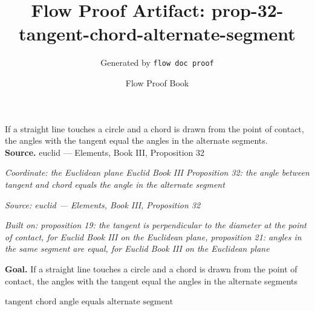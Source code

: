 \documentclass[11pt]{article}
\title{Flow Proof Artifact: prop-32-tangent-chord-alternate-segment}
\author{Generated by \texttt{flow doc proof}}
\date{Flow Proof Book}
\theoremstyle{definition}
\begin{document}
\maketitle
If a straight line touches a circle and a chord is drawn from the point of contact, the angles with the tangent equal the angles in the alternate segments.\\[0.5em]
\textbf{Source.} euclid — Elements, Book III, Proposition 32\\[0.5em]
\bigskip
{}\par
\smallskip\noindent\textit{Coordinate: the Euclidean plane \cdot Euclid Book III \cdot Proposition 32: the angle between tangent and chord equals the angle in the alternate segment}\par
\smallskip\noindent\textit{Source: euclid — Elements, Book III, Proposition 32}\par
\smallskip\noindent\textit{Built on: proposition 19: the tangent is perpendicular to the diameter at the point of contact, for Euclid Book III on the Euclidean plane, proposition 21: angles in the same segment are equal, for Euclid Book III on the Euclidean plane}\par
\medskip
\noindent\textbf{Goal.} If a straight line touches a circle and a chord is drawn from the point of contact, the angles with the tangent equal the angles in the alternate segments\par
\noindent$\displaystyle \text{tangent chord angle equals alternate segment}$\par
\medskip
\noindent
\end{document}
